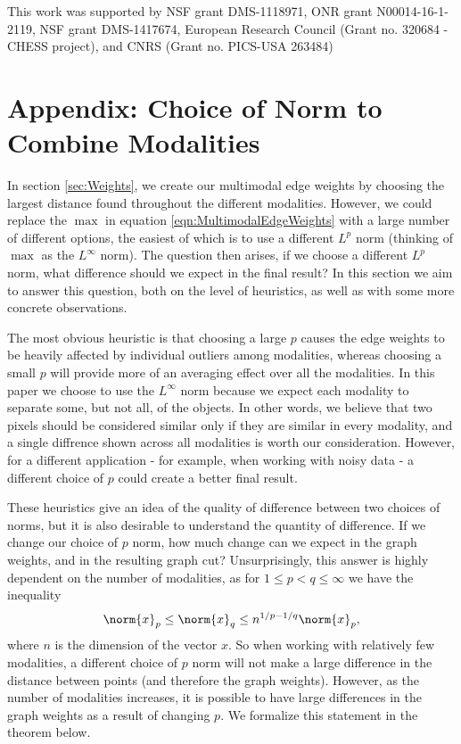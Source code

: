 \documentclass[journal]{IEEEtran}
\begin{document}
This work was supported by NSF grant DMS-1118971, ONR grant N00014-16-1-2119,
NSF grant DMS-1417674, European Research Council (Grant no. 320684 - CHESS
project), and CNRS (Grant no. PICS-USA 263484)

\appendix
\section{Appendix: Choice of Norm to Combine Modalities}\label{sec:WeightsProof}

In section \ref{sec:Weights}, we create our multimodal edge weights by choosing the largest distance found throughout the different modalities. However, we could replace the $\max$ in equation \ref{eqn:MultimodalEdgeWeights} with a large number of different options, the easiest of which is to use a different $L^p$ norm (thinking of $\max$ as the $L^\infty$ norm). The question then arises, if we choose a different $L^p$ norm, what difference should we expect in the final result? In this section we aim to answer this question, both on the level of heuristics, as well as with some more concrete observations.

The most obvious heuristic is that choosing a large $p$ causes the edge weights to be heavily affected by individual outliers among modalities, whereas choosing a small $p$ will provide more of an averaging effect over all the modalities. In this paper we choose to use the $L^\infty$ norm because we expect each modality to separate some, but not all, of the objects. In other words, we believe that two pixels should be considered similar only if they are similar in every modality, and a single diffrence shown across all modalities is worth our consideration. However, for a different application - for example, when working with noisy data - a different choice of $p$ could create a better final result.

These heuristics give an idea of the quality of difference between two choices of norms, but it is also desirable to understand the quantity of difference. If we change our choice of $p$ norm, how much change can we expect in the graph weights, and in the resulting graph cut? Unsurprisingly, this answer is highly dependent on the number of modalities, as for $1 \leq p < q \leq \infty$ we have the inequality
\begin{align}
  \norm{x}_p \leq \norm{x}_q \leq n^{1/p - 1/q}\norm{x}_p,
\end{align}
where $n$ is the dimension of the vector $x$. So when working with relatively few modalities, a different choice of $p$ norm will not make a large difference in the distance between points (and therefore the graph weights). However, as the number of modalities increases, it is possible to have large differences in the graph weights as a result of changing $p$. We formalize this statement in the theorem below.
\end{document}
